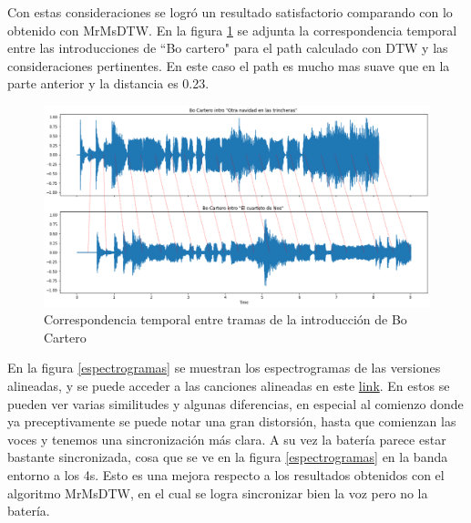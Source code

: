 \documentclass{article}
\begin{document}
Con estas consideraciones se logró un resultado satisfactorio comparando con lo obtenido con MrMsDTW. En la figura \ref{correspondencia} se adjunta la correspondencia temporal entre las introducciones de ``Bo cartero" para el path calculado con DTW y las consideraciones pertinentes. En este caso el path es mucho mas suave que en la parte anterior y la distancia es 0.23. 

\begin{figure}[!h]
    \centering
    \includegraphics[width=\textwidth]{Alineamientos/alineamiento.png}
    \caption{Correspondencia temporal entre tramas de la introducción de Bo Cartero}
    \label{correspondencia}
\end{figure}

En la figura \ref{espectrogramas} se muestran los espectrogramas de las versiones alineadas, y se puede acceder a las canciones alineadas en este \href{https://drive.google.com/drive/folders/1IeRXLXKivI5VXjGnCVVK31Mhy6xFf_kc?usp=sharing}{link}. En estos se pueden ver varias similitudes y algunas diferencias, en especial al comienzo donde ya preceptivamente se puede notar una gran distorsión, hasta que comienzan las voces y tenemos una sincronización más clara. A su vez la batería parece estar bastante sincronizada, cosa que se ve en la figura \ref{espectrogramas} en la banda entorno a los 4s. Esto es una mejora respecto a los resultados obtenidos con el algoritmo MrMsDTW, en el cual se logra sincronizar bien la voz pero no la batería. 
\end{document}
